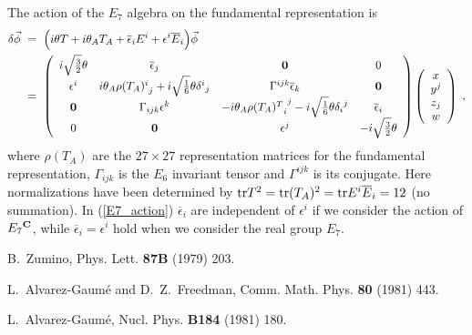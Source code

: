 \documentclass[a4paper,11pt]{article}
\newcommand{\ol}{\overline}
\newcommand{\tr}{{\rm tr}}
\begin{document}
{\begin{appendix}
The action of the $E_7$ algebra on 
the fundamental representation is 
\begin{align}
\delta \vec{\phi}
\ &= \ \Big( i \theta T + i \theta_A T_A 
    + \ol{\epsilon}_i E^i + \epsilon^i \ol{E}_i \Big) \vec{\phi}
\nonumber \\
\ &= \ \left(
\begin{array}{cccc}
i \sqrt{\frac{3}{2}} \theta & \ol{\epsilon}_j  & {\bf 0} & 0 \\
\epsilon^i & i \theta_A {\rho(T_A)^i}_j + i \sqrt{\frac{1}{6}} \theta
{\delta^i}_j & {\Gamma}^{ijk} \ol{\epsilon}_k & {\bf 0} \\
  {\bf 0} & \Gamma_{ijk} \epsilon^k & - i \theta_A {{\rho({T_A})^T}_i}^j 
- i\sqrt{\frac{1}{6}} \theta {\delta_i}^j & \ol{\epsilon}_i \\
   0 & {\bf 0} & \epsilon^j & -i \sqrt{\frac{3}{2}}\theta 
\end{array} \right) \left(
\begin{array}{c}
x \\
y^j \\
z_j \\
 w
\end{array} \right) \; , \label{E7_action}
\end{align}
where $\rho(T_A)$ are the $27 \times 27$ representation matrices
for the fundamental representation, 
$\Gamma_{ijk}$ is the $E_6$ invariant tensor 
and $\Gamma^{ijk}$ is its conjugate.
Here normalizations have been determined by 
$\tr T^2 = \tr (T_A)^2 = \tr E^i \ol{E}_i = 12$ 
(no summation). 
In (\ref{E7_action}) 
$\ol{\epsilon}_i$ are independent of 
$\epsilon^i$ 
if we consider the action of $E_7{}^{\bf C}$, 
while $\ol{\epsilon}_i = \epsilon^i$ hold 
when we consider the real group $E_7$. 

\end{appendix}


\begin{thebibliography}{99}

B.~Zumino, Phys. Lett. {\bf 87B} (1979) 203.

L.~Alvarez-Gaum\'{e} and D.~Z.~Freedman, 
Comm. Math. Phys. {\bf 80} (1981) 443.

L.~Alvarez-Gaum\'{e}, Nucl. Phys. {\bf B184} (1981) 180. 


\end{thebibliography}}
\end{document}
